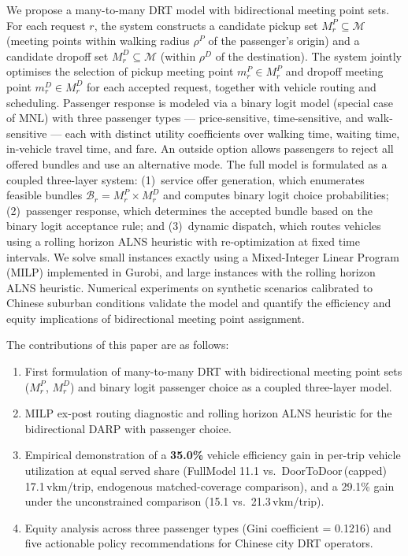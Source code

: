 We propose a many-to-many DRT model with bidirectional meeting point sets.
For each request $r$, the system constructs a candidate pickup set
$M_r^P \subseteq \mathcal{M}$ (meeting points within walking radius $\rho^P$ of the
passenger's origin) and a candidate dropoff set
$M_r^D \subseteq \mathcal{M}$ (within $\rho^D$ of the destination).
The system jointly optimises the selection of pickup meeting point $m_r^P \in M_r^P$
and dropoff meeting point $m_r^D \in M_r^D$ for each accepted request, together with
vehicle routing and scheduling.
Passenger response is modeled via a binary logit model (special case of MNL) with three
passenger types — price-sensitive, time-sensitive, and walk-sensitive — each with
distinct utility coefficients over walking time, waiting time, in-vehicle travel time,
and fare.
An outside option allows passengers to reject all offered bundles and use an
alternative mode.
The full model is formulated as a coupled three-layer system:
(1)~service offer generation, which enumerates feasible bundles
$\mathcal{B}_r = M_r^P \times M_r^D$ and computes binary logit choice probabilities;
(2)~passenger response, which determines the accepted bundle based on the binary logit acceptance rule;
and (3)~dynamic dispatch, which routes vehicles using a rolling horizon ALNS
heuristic with re-optimization at fixed time intervals.
We solve small instances exactly using a Mixed-Integer Linear Program (MILP)
implemented in Gurobi, and large instances with the rolling horizon ALNS heuristic.
Numerical experiments on synthetic scenarios calibrated to Chinese suburban conditions
validate the model and quantify the efficiency and equity implications of bidirectional
meeting point assignment.

The contributions of this paper are as follows:

\begin{enumerate}
  \item First formulation of many-to-many DRT with bidirectional meeting point sets
        ($M_r^P$, $M_r^D$) and binary logit passenger choice as a coupled three-layer model.
  \item MILP ex-post routing diagnostic and rolling horizon ALNS heuristic for the bidirectional
        DARP with passenger choice.
  \item Empirical demonstration of a \textbf{35.0\%} vehicle efficiency gain in
        per-trip vehicle utilization at equal served share (FullModel 11.1 vs.\
        DoorToDoor\,(capped) 17.1\,vkm/trip, endogenous matched-coverage comparison),
        and a 29.1\% gain under the unconstrained comparison (15.1 vs.\ 21.3\,vkm/trip).
  \item Equity analysis across three passenger types (Gini coefficient = 0.1216) and
        five actionable policy recommendations for Chinese city DRT operators.
\end{enumerate}

